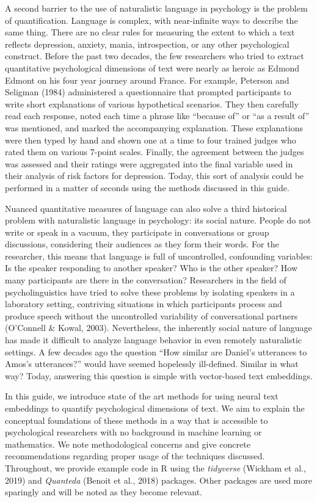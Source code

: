 \documentclass[
  man,
  floatsintext,
  longtable,
  nolmodern,
  notxfonts,
  notimes,
  colorlinks=true,linkcolor=blue,citecolor=blue,urlcolor=blue]{apa7}
\begin{document}
A second barrier to the use of naturalistic language in psychology is
the problem of quantification. Language is complex, with near-infinite
ways to describe the same thing. There are no clear rules for measuring
the extent to which a text reflects depression, anxiety, mania,
introspection, or any other psychological construct. Before the past two
decades, the few researchers who tried to extract quantitative
psychological dimensions of text were nearly as heroic as Edmond Edmont
on his four year journey around France. For example, Peterson and
Seligman (1984) administered a questionnaire that prompted participants
to write short explanations of various hypothetical scenarios. They then
carefully read each response, noted each time a phrase like ``because
of'' or ``as a result of'' was mentioned, and marked the accompanying
explanation. These explanations were then typed by hand and shown one at
a time to four trained judges who rated them on various 7-point scales.
Finally, the agreement between the judges was assessed and their ratings
were aggregated into the final variable used in their analysis of risk
factors for depression. Today, this sort of analysis could be performed
in a matter of seconds using the methods discussed in this guide.

Nuanced quantitative measures of language can also solve a third
historical problem with naturalistic language in psychology: its social
nature. People do not write or speak in a vacuum, they participate in
conversations or group discussions, considering their audiences as they
form their words. For the researcher, this means that language is full
of uncontrolled, confounding variables: Is the speaker responding to
another speaker? Who is the other speaker? How many participants are
there in the conversation? Researchers in the field of psycholinguistics
have tried to solve these problems by isolating speakers in a laboratory
setting, contriving situations in which participants process and produce
speech without the uncontrolled variability of conversational partners
(O'Connell \& Kowal, 2003). Nevertheless, the inherently social nature
of language has made it difficult to analyze language behavior in even
remotely naturalistic settings. A few decades ago the question ``How
similar are Daniel's utterances to Amos's utterances?'' would have
seemed hopelessly ill-defined. Similar in what way? Today, answering
this question is simple with vector-based text embeddings.

In this guide, we introduce state of the art methods for using neural
text embeddings to quantify psychological dimensions of text. We aim to
explain the conceptual foundations of these methods in a way that is
accessible to psychological researchers with no background in machine
learning or mathematics. We note methodological concerns and give
concrete recommendations regarding proper usage of the techniques
discussed. Throughout, we provide example code in R using the
\emph{tidyverse} (Wickham et al., 2019) and \emph{Quanteda} (Benoit et
al., 2018) packages. Other packages are used more sparingly and will be
noted as they become relevant.
\end{document}
